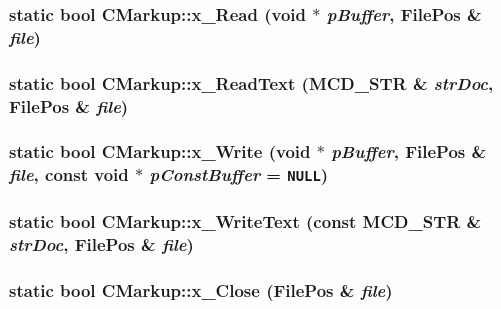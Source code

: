 \subsubsection[x\_\-Read]{\setlength{\rightskip}{0pt plus 5cm}static bool CMarkup::x\_\-Read (void $\ast$ {\em pBuffer}, \/  {\bf FilePos} \& {\em file})\hspace{0.3cm}{\tt  [static, protected]}}\label{classCMarkup_964ac1162ed011717ccafad4316b8d6f}


\subsubsection[x\_\-ReadText]{\setlength{\rightskip}{0pt plus 5cm}static bool CMarkup::x\_\-ReadText (MCD\_\-STR \& {\em strDoc}, \/  {\bf FilePos} \& {\em file})\hspace{0.3cm}{\tt  [static, protected]}}\label{classCMarkup_afa2fa03d13b7be7b26dd310d61b690c}


\subsubsection[x\_\-Write]{\setlength{\rightskip}{0pt plus 5cm}static bool CMarkup::x\_\-Write (void $\ast$ {\em pBuffer}, \/  {\bf FilePos} \& {\em file}, \/  const void $\ast$ {\em pConstBuffer} = {\tt NULL})\hspace{0.3cm}{\tt  [static, protected]}}\label{classCMarkup_01ba599cf9cc448581f2e8bcf994c253}


\subsubsection[x\_\-WriteText]{\setlength{\rightskip}{0pt plus 5cm}static bool CMarkup::x\_\-WriteText (const MCD\_\-STR \& {\em strDoc}, \/  {\bf FilePos} \& {\em file})\hspace{0.3cm}{\tt  [static, protected]}}\label{classCMarkup_f3b30bc5314bbc8d157dca6d924f4852}


\subsubsection[x\_\-Close]{\setlength{\rightskip}{0pt plus 5cm}static bool CMarkup::x\_\-Close ({\bf FilePos} \& {\em file})\hspace{0.3cm}{\tt  [static, protected]}}\label{classCMarkup_e7a551c23d0d5c9aef4ef89ac81d6c83}


